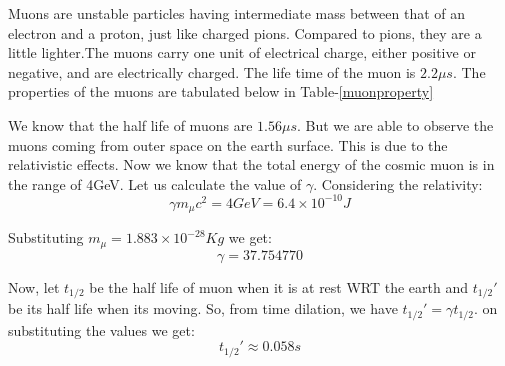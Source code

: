 \documentclass{article}
\begin{document}
\begin{multicols}{2}
Muons are unstable particles having intermediate mass between that of an 
electron and a proton, just like charged pions. Compared to pions, they are 
a little lighter.The muons carry one unit of electrical charge, either positive 
or negative, and are electrically charged. The life time of the muon is $2.2\mu s$.
The properties of the muons are tabulated below in Table-\ref{muonproperty}

\begin{table}[H]
    \centering
    \caption{Properties of Muons}
    \label{muonproperty}
\end{table}

We know that the half life of muons are $1.56\mu s$. But we are able to observe 
the muons coming from outer space on the earth surface. This is due to the relativistic
effects. Now we know that the total energy of the cosmic muon is in the range of 4GeV.
Let us calculate the value of $\gamma$. Considering the relativity:
\begin{equation}
    \gamma m_{\mu} c^2 =4GeV = 6.4\times10^{-10} J
\end{equation}

Substituting $m_{\mu} = 1.883 \times 10^{-28} Kg$ we get:
\begin{equation}
    \gamma = 37.754770
\end{equation}


Now, let $t_{1/2}$ be the half life of muon when it is at rest WRT the earth and $t_{1/2}'$ 
be its half life when its moving. So, from time dilation, we have $t_{1/2}' =\gamma t_{1/2} $.
on substituting the values we get:
\begin{equation}
    t_{1/2}' \approx 0.058s
\end{equation}



\end{multicols}
\end{document}
